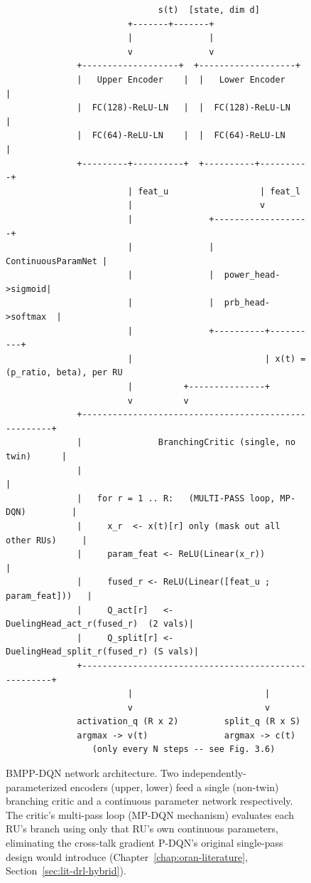 \begin{figure}[htbp]
\centering
{\footnotesize
\begin{verbatim}
                              s(t)  [state, dim d]
                        +-------+-------+
                        |               |
                        v               v
              +-------------------+  +-------------------+
              |   Upper Encoder    |  |   Lower Encoder    |
              |  FC(128)-ReLU-LN   |  |  FC(128)-ReLU-LN   |
              |  FC(64)-ReLU-LN    |  |  FC(64)-ReLU-LN    |
              +---------+----------+  +----------+----------+
                        | feat_u                  | feat_l
                        |                         v
                        |               +-------------------+
                        |               | ContinuousParamNet |
                        |               |  power_head->sigmoid|
                        |               |  prb_head->softmax  |
                        |               +----------+----------+
                        |                          | x(t) = (p_ratio, beta), per RU
                        |          +---------------+
                        v          v
              +-----------------------------------------------------+
              |               BranchingCritic (single, no twin)      |
              |                                                       |
              |   for r = 1 .. R:   (MULTI-PASS loop, MP-DQN)         |
              |     x_r  <- x(t)[r] only (mask out all other RUs)     |
              |     param_feat <- ReLU(Linear(x_r))                  |
              |     fused_r <- ReLU(Linear([feat_u ; param_feat]))   |
              |     Q_act[r]   <- DuelingHead_act_r(fused_r)  (2 vals)|
              |     Q_split[r] <- DuelingHead_split_r(fused_r) (S vals)|
              +-----------------------------------------------------+
                        |                          |
                        v                          v
              activation_q (R x 2)         split_q (R x S)
              argmax -> v(t)               argmax -> c(t)
                 (only every N steps -- see Fig. 3.6)
\end{verbatim}
}
\caption{BMPP-DQN network architecture. Two independently-parameterized
  encoders (upper, lower) feed a single (non-twin) branching critic and a
  continuous parameter network respectively. The critic's multi-pass loop
  (MP-DQN mechanism) evaluates each RU's branch using only that RU's own
  continuous parameters, eliminating the cross-talk gradient P-DQN's
  original single-pass design would introduce
  (Chapter~\ref{chap:oran-literature}, Section~\ref{sec:lit-drl-hybrid}).}
\label{fig:oran-bmpp-arch}
\end{figure}

